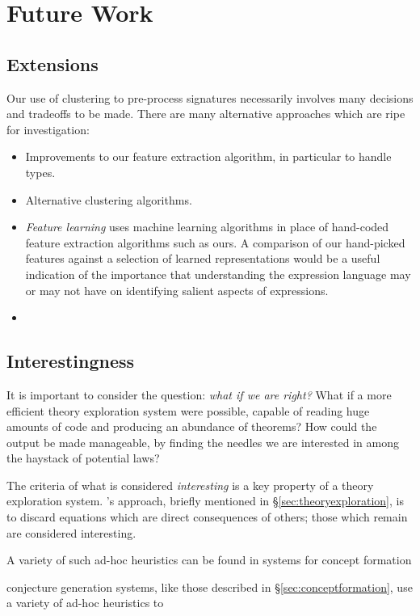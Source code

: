 \section{Future Work}
\label{sec:future}

\subsection{Extensions}
\label{sec:preprocessing}

Our use of clustering to pre-process \qcheck{} signatures necessarily involves many decisions and tradeoffs to be made. There are many alternative approaches which are ripe for investigation:

\begin{itemize}
  \item Improvements to our feature extraction algorithm, in particular to handle types.
  \item Alternative clustering algorithms.
  \item \emph{Feature learning} uses machine learning algorithms in place of hand-coded feature extraction algorithms such as ours. A comparison of our hand-picked features against a selection of learned representations would be a useful indication of the importance that understanding the expression language may or may not have on identifying salient aspects of expressions.
  \item
\end{itemize}

\subsection{Interestingness}
\label{sec:interestingness}

It is important to consider the question: \emph{what if we are right?} What if a more efficient theory exploration system were possible, capable of reading huge amounts of code and producing an  abundance of theorems? How could the output be made manageable, by finding the needles we are interested in among the haystack of potential laws?

The criteria of what is considered \emph{interesting} is a key property of a theory exploration system. \qspec{}'s approach, briefly mentioned in \S \ref{sec:theoryexploration}, is to discard equations which are direct consequences of others; those which remain are considered interesting.

A variety of such ad-hoc heuristics can be found in systems for concept formation

 conjecture generation systems, like those described in \S \ref{sec:conceptformation}, use a variety of ad-hoc heuristics to

